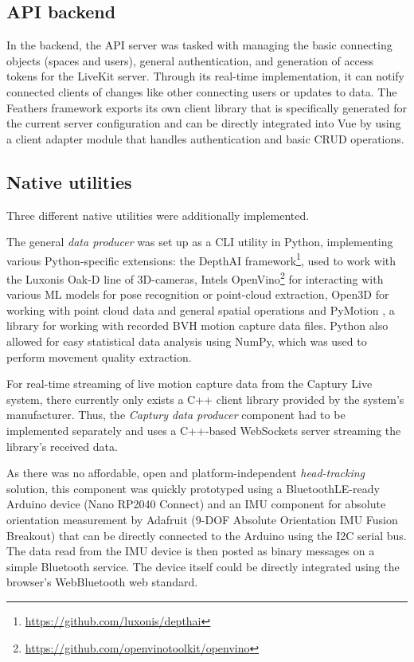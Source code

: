 \subsection{API backend}

In the backend, the \ac{API} server was tasked with managing the basic connecting objects (spaces and users), general authentication, and generation of access tokens for the LiveKit server.
Through its real-time implementation, it can notify connected clients of changes like other connecting users or updates to data.
The Feathers framework exports its own client library that is specifically generated for the current server configuration and can be directly integrated into Vue by using a client adapter module that handles authentication and basic \ac{CRUD} operations.

\subsection{Native utilities}

Three different native utilities were additionally implemented.

The general \emph{data producer} was set up as a \ac{CLI} utility in Python, implementing various Python-specific extensions: the DepthAI framework\footnote{\url{https://github.com/luxonis/depthai}}, used to work with the Luxonis Oak-D line of \ac{3D}-cameras, Intel\textquotesingle s OpenVino\footnote{\url{https://github.com/openvinotoolkit/openvino}} for interacting with various \ac{ML} models for pose recognition or point-cloud extraction, Open3D \parencite{open3DZhou2018} for working with point cloud data and general spatial operations and PyMotion \parencite{githubPyMotion}, a library for working with recorded \ac{BVH} motion capture data files.
Python also allowed for easy statistical data analysis using NumPy, which was used to perform movement quality extraction.

For real-time streaming of live motion capture data from the Captury Live system, there currently only exists a C++ client library provided by the system's manufacturer.
Thus, the \emph{Captury data producer} component had to be implemented separately and uses a C++-based WebSockets server streaming the library's received data.

As there was no affordable, open and platform-independent \emph{head-tracking} solution, this component was quickly prototyped using a BluetoothLE-ready Arduino device (Nano RP2040 Connect) and an \ac{IMU} component for absolute orientation measurement by Adafruit (9-DOF Absolute Orientation IMU Fusion Breakout) that can be directly connected to the Arduino using the \ac{I2C} serial bus.
The data read from the \ac{IMU} device is then posted as binary messages on a simple Bluetooth service.
The device itself could be directly integrated using the browser's WebBluetooth web standard.

